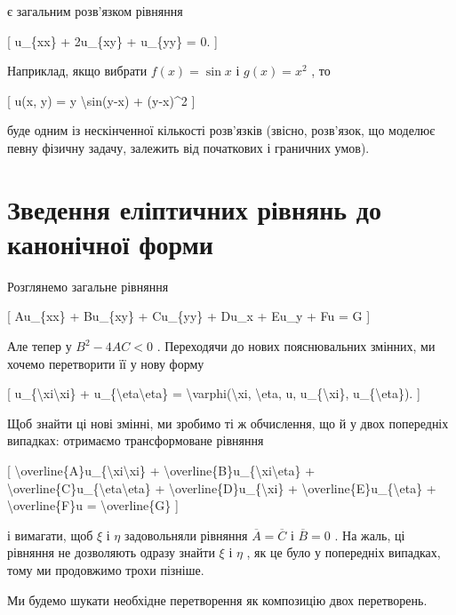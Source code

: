 \documentclass[
]{article}
\begin{document}
є загальним розв'язком рівняння

{[} u\_\{xx\} + 2u\_\{xy\} + u\_\{yy\} = 0. {]}

Наприклад, якщо вибрати \(f(x) = \sin x\) і \(g(x) = x^2\) , то

{[} u(x, y) = y \textbackslash sin(y-x) + (y-x)\^{}2 {]}

буде одним із нескінченної кількості розв'язків (звісно, розв'язок, що
моделює певну фізичну задачу, залежить від початкових і граничних умов).

\section{Зведення еліптичних рівнянь до канонічної
форми}\label{ux437ux432ux435ux434ux435ux43dux43dux44f-ux435ux43bux456ux43fux442ux438ux447ux43dux438ux445-ux440ux456ux432ux43dux44fux43dux44c-ux434ux43e-ux43aux430ux43dux43eux43dux456ux447ux43dux43eux457-ux444ux43eux440ux43cux438}

Розглянемо загальне рівняння

{[} Au\_\{xx\} + Bu\_\{xy\} + Cu\_\{yy\} + Du\_x + Eu\_y + Fu = G {]}

Але тепер у \(B^2-4AC<0\) . Переходячи до нових пояснювальних змінних,
ми хочемо перетворити її у нову форму

{[} u\_\{\textbackslash xi\textbackslash xi\} +
u\_\{\textbackslash eta\textbackslash eta\} =
\textbackslash varphi(\textbackslash xi, \textbackslash eta, u,
u\_\{\textbackslash xi\}, u\_\{\textbackslash eta\}). {]}

Щоб знайти ці нові змінні, ми зробимо ті ж обчислення, що й у двох
попередніх випадках: отримаємо трансформоване рівняння

{[}
\textbackslash overline\{A\}u\_\{\textbackslash xi\textbackslash xi\} +
\textbackslash overline\{B\}u\_\{\textbackslash xi\textbackslash eta\} +
\textbackslash overline\{C\}u\_\{\textbackslash eta\textbackslash eta\}
+ \textbackslash overline\{D\}u\_\{\textbackslash xi\} +
\textbackslash overline\{E\}u\_\{\textbackslash eta\} +
\textbackslash overline\{F\}u = \textbackslash overline\{G\} {]}

і вимагати, щоб \(\xi\) і \(\eta\) задовольняли рівняння
\(\overline{A}=\overline{C}\) і \(\overline{B}=0\) . На жаль, ці
рівняння не дозволяють одразу знайти \(\xi\) і \(\eta\) , як це було у
попередніх випадках, тому ми продовжимо трохи пізніше.

Ми будемо шукати необхідне перетворення як композицію двох перетворень.
\end{document}
